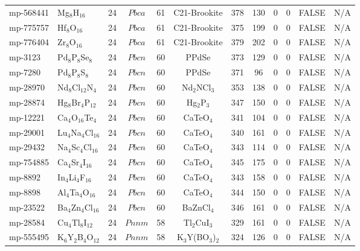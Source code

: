 {\begin{longtable}{llcccccccccc}
    mp-568441 & Mg$_{8}$H$_{16}$ & 24    & $Pbca$ & 61    & C21-Brookite & 378   & 130   & 0     & 0     & FALSE & N/A \\
    mp-775757 & Hf$_{8}$O$_{16}$ & 24    & $Pbca$ & 61    & C21-Brookite & 375   & 199   & 0     & 0     & FALSE & N/A \\
    mp-776404 & Zr$_{8}$O$_{16}$ & 24    & $Pbca$ & 61    & C21-Brookite & 379   & 202   & 0     & 0     & FALSE & N/A \\
    mp-3123 & Pd$_{8}$P$_{8}$Se$_{8}$ & 24    & $Pbcn$ & 60    & PPdSe & 373   & 129   & 0     & 0     & FALSE & N/A \\
    mp-7280 & Pd$_{8}$P$_{8}$S$_{8}$ & 24    & $Pbcn$ & 60    & PPdSe & 371   & 96    & 0     & 0     & FALSE & N/A \\
    mp-28970 & Nd$_{8}$Cl$_{12}$N$_{4}$ & 24    & $Pbcn$ & 60    & Nd$_{2}$NCl$_{3}$ & 353   & 138   & 0     & 0     & FALSE & N/A \\
    mp-28874 & Hg$_{8}$Br$_{4}$P$_{12}$ & 24    & $Pbcn$ & 60    & Hg$_{2}$P$_{3}$ & 347   & 150   & 0     & 0     & FALSE & N/A \\
    mp-12221 & Ca$_{4}$O$_{16}$Te$_{4}$ & 24    & $Pbcn$ & 60    & CaTeO$_{4}$ & 341   & 104   & 0     & 0     & FALSE & N/A \\
    mp-29001 & Lu$_{4}$Na$_{4}$Cl$_{16}$ & 24    & $Pbcn$ & 60    & CaTeO$_{4}$ & 340   & 161   & 0     & 0     & FALSE & N/A \\
    mp-29432 & Na$_{4}$Sc$_{4}$Cl$_{16}$ & 24    & $Pbcn$ & 60    & CaTeO$_{4}$ & 343   & 114   & 0     & 0     & FALSE & N/A \\
    mp-754885 & Ca$_{4}$Sr$_{4}$I$_{16}$ & 24    & $Pbcn$ & 60    & CaTeO$_{4}$ & 345   & 175   & 0     & 0     & FALSE & N/A \\
    mp-8892 & In$_{4}$Li$_{4}$F$_{16}$ & 24    & $Pbcn$ & 60    & CaTeO$_{4}$ & 343   & 158   & 0     & 0     & FALSE & N/A \\
    mp-8898 & Al$_{4}$Ta$_{4}$O$_{16}$ & 24    & $Pbcn$ & 60    & CaTeO$_{4}$ & 344   & 150   & 0     & 0     & FALSE & N/A \\
    mp-23522 & Ba$_{4}$Zn$_{4}$Cl$_{16}$ & 24    & $Pbcn$ & 60    & BaZnCl$_{4}$ & 346   & 161   & 0     & 0     & FALSE & N/A \\
    mp-28584 & Cu$_{4}$Tl$_{8}$I$_{12}$ & 24    & $Pnnm$ & 58    & Tl$_{2}$CuI$_{3}$ & 329   & 161   & 0     & 0     & FALSE & N/A \\
    mp-555495 & K$_{6}$Y$_{2}$B$_{4}$O$_{12}$ & 24    & $Pnnm$ & 58    & K$_{3}$Y(BO$_{3}$)$_{2}$ & 324   & 126   & 0     & 0     & FALSE & N/A \\

\end{longtable}}
